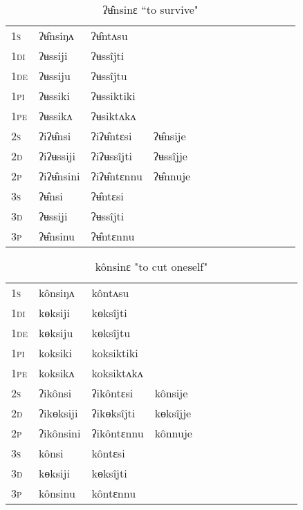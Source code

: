 \documentclass[oldfontcommands,oneside,a4paper,11pt]{article}
\begin{document}
\begin{table}[H]
\label{u.vr} \centering 
\caption{ ʔʉ̂nsinɛ  ``to survive"  }
\begin{tabular}{l|l|l|l|l|l|l|l|l|l|l|l|l}  \toprule
\textsc{1s} &ʔʉ̂nsiŋʌ &ʔʉ̂ntʌsu \\ 
\textsc{1di} &ʔʉssiji &ʔʉssîjti   \\
\textsc{1de} &ʔʉssiju &ʔʉssîjtu   \\ 
\textsc{1pi} &ʔʉssiki &ʔʉssiktiki   \\ 
\textsc{1pe} &ʔʉssikʌ &ʔʉsiktʌkʌ   \\ 
\textsc{2s} & ʔiʔʉ̂nsi & ʔiʔʉ̂ntɛsi &ʔʉ̂nsije  \\ 
\textsc{2d} & ʔiʔʉssiji & ʔiʔʉssîjti &ʔʉssîjje    \\
\textsc{2p} & ʔiʔʉ̂nsini  & ʔiʔʉ̂ntɛnnu &ʔʉ̂nnuje  \\ 
\textsc{3s} & ʔʉ̂nsi & ʔʉ̂ntɛsi   \\ 
\textsc{3d} & ʔʉssiji & ʔʉssîjti   \\ 
\textsc{3p} & ʔʉ̂nsinu  & ʔʉ̂ntɛnnu \\ 
\bottomrule
\end{tabular}
\end{table}


\begin{table}[H]
\label{ok.vr} \centering 
\caption{kônsinɛ  "to cut oneself"  }
\begin{tabular}{l|l|l|l|l|l|l|l|l|l|l|l|l}  \toprule
\textsc{1s} &kônsiŋʌ &kôntʌsu \\ 
\textsc{1di} &kɵksiji &kɵksîjti   \\
\textsc{1de} &kɵksiju &kɵksîjtu   \\ 
\textsc{1pi} &koksiki &koksiktiki   \\ 
\textsc{1pe} &koksikʌ &koksiktʌkʌ   \\ 
\textsc{2s} & ʔikônsi & ʔikôntɛsi &kônsije  \\ 
\textsc{2d} & ʔikɵksiji & ʔikɵksîjti &kɵksîjje    \\
\textsc{2p} & ʔikônsini  & ʔikôntɛnnu &kônnuje  \\ 
\textsc{3s} & kônsi & kôntɛsi   \\ 
\textsc{3d} & kɵksiji & kɵksîjti   \\ 
\textsc{3p} & kônsinu  & kôntɛnnu \\ 
\bottomrule
\end{tabular}
\end{table}
\end{document}
